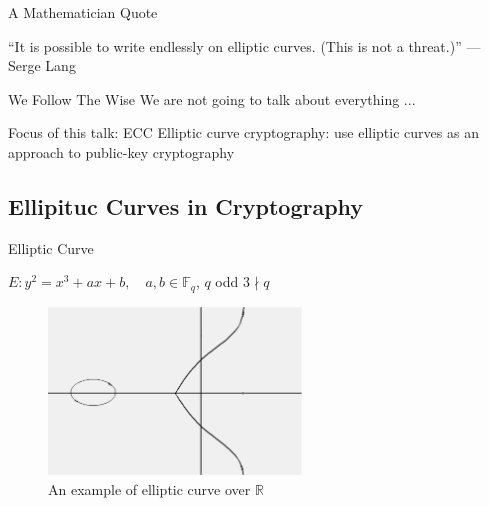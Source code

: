 \documentclass{beamer}
\begin{document}
\begin{frame}{A Mathematician Quote}
\begin{center}
 {\Large ``It is possible to write endlessly on elliptic curves. (This is not 
a threat.)''
\hfill --- Serge Lang}
\end{center}
\end{frame}

\begin{frame}{We Follow The Wise}
We are not going to talk about everything ...

\begin{block}{Focus of this talk: ECC}
Elliptic curve cryptography: use elliptic curves as an approach to public-key 
cryptography
\end{block}
\end{frame}

\subsection{Ellipituc Curves in Cryptography}

\begin{frame}{Elliptic Curve}
\begin{center}
{\Large 
$E: y^2 = x^3 + a x + b, \quad a, b\in \mathbb{F}_q$, $q$ odd $3 \nmid q$
}
\end{center}
\begin{figure}[htbp]
\centering
  \includegraphics[width=0.6\textwidth]{img/ecurve.pdf}
  \caption{An example of elliptic curve over $\mathbb{R}$}
  \label{fig:ecurve}
\end{figure}

\end{frame}
\end{document}
